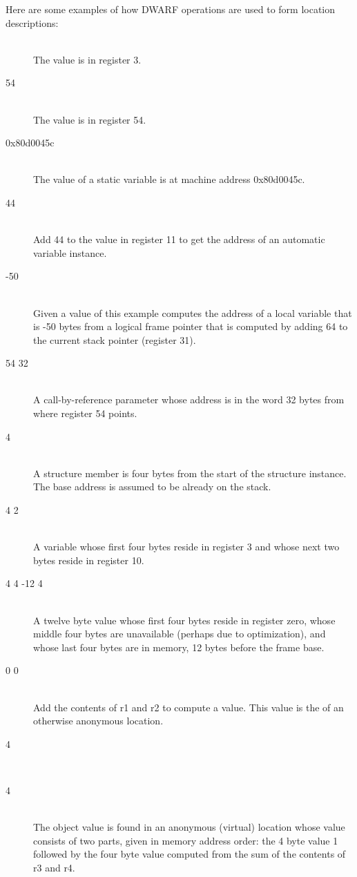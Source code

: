 Here are some examples of how DWARF operations are used to form location descriptions:
\newcommand{\descriptionitemnl}[1]{\item[#1]\mbox{}\\}
\begin{description}
\descriptionitemnl{\DWOPregthree}
The value is in register 3.

\descriptionitemnl{\DWOPregx{} 54}
The value is in register 54.

\descriptionitemnl{\DWOPaddr{} 0x80d0045c}
The value of a static variable is at machine address 0x80d0045c.

\descriptionitemnl{\DWOPbregeleven{} 44}
Add 44 to the value in register 11 to get the address of an automatic
variable instance.

\descriptionitemnl{\DWOPfbreg{} -50}
Given a \DWATframebase{} value of
 this example
computes the address of a local variable that is -50 bytes from a
logical frame pointer that is computed by adding 64 to the current
stack pointer (register 31).

\descriptionitemnl{\DWOPbregx{} 54 32 \DWOPderef}
A call-by-reference parameter whose address is in the word 32 bytes
from where register 54 points.

\descriptionitemnl{\DWOPplusuconst{} 4}
A structure member is four bytes from the start of the structure
instance. The base address is assumed to be already on the stack.

\descriptionitemnl{\DWOPregthree{} \DWOPpiece{} 4 \DWOPregten{} \DWOPpiece{} 2}
A variable whose first four bytes reside in register 3 and whose next
two bytes reside in register 10.

\descriptionitemnl{\DWOPregzero{} \DWOPpiece{} 4 \DWOPpiece{} 4 \DWOPfbreg{} -12 \DWOPpiece{} 4}
A twelve byte value whose first four bytes reside in register zero,
whose middle four bytes are unavailable (perhaps due to optimization),
and whose last four bytes are in memory, 12 bytes before the frame
base.

\descriptionitemnl{\DWOPbregone{} 0 \DWOPbregtwo{} 0 \DWOPplus{} \DWOPstackvalue{} }
Add the contents of r1 and r2 to compute a value. This value is the
 of an otherwise anonymous location.

\descriptionitemnl{\DWOPlitone{} \DWOPstackvalue{} \DWOPpiece{} 4 }
\vspace{-0.1\parsep}
\descriptionitemnl{  \DWOPplus{} \DWOPstackvalue{} \DWOPpiece{} 4}
The object value is found in an anonymous (virtual) location whose
value consists of two parts, given in memory address order: the 4 byte
value 1 followed by the four byte value computed from the sum of the
contents of r3 and r4.
\end{description}


